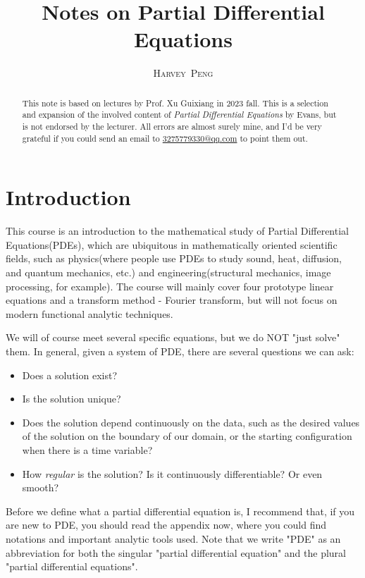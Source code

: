 \documentclass[hyperref,UTF8,12pt]{article}
\title{Notes on Partial Differential Equations}
\author{H\textsc{arvey}\ P\textsc{eng}}
\numberwithin{equation}{subsection}
\theoremstyle{plain}
\theoremstyle{definition}
\numberwithin{theorem}{section}
\numberwithin{lemma}{section}
\numberwithin{proposition}{section}
\numberwithin{remark}{section}
\numberwithin{corollary}{section}
\numberwithin{definition}{section}
\numberwithin{problem}{section}
\numberwithin{example}{section}
\begin{document}
\maketitle
\begin{abstract}
This note is based on lectures by Prof. Xu Guixiang in 2023 fall. This is a selection and expansion of the involved content of \textit{Partial Differential Equations} by Evans, but is not endorsed by the lecturer. All errors are almost surely mine, and I'd be very grateful if you could send an email to \href{mailto:3275779330@qq.com}{3275779330@qq.com} to point them out.
\end{abstract} 

\tableofcontents
\newpage 
\section{Introduction}

This course is an introduction to the mathematical study of Partial Differential
Equations(PDEs), which are ubiquitous in mathematically oriented scientific fields, such as physics(where people use PDEs to study sound, heat, diffusion, and quantum mechanics, etc.) and engineering(structural mechanics, image processing, for example). The course will mainly cover four prototype linear equations and a transform method - Fourier transform, but will not focus on modern functional analytic techniques.

We will of course meet several specific equations, but we do NOT "just solve" them. In general, given a system of PDE, there are several questions we can ask:
\begin{itemize}
	\item Does a solution exist?
	\item Is the solution unique?
	\item Does the solution depend continuously on the data, such as the desired values of the solution on the boundary of our domain, or the
	starting configuration when there is a time variable?
	\item How \textit{regular} is the solution? Is it continuously differentiable? Or even
	smooth?
\end{itemize}


Before we define what a partial differential equation is, I recommend that, if you are new to PDE, you should read the appendix now, where you could find notations and important analytic tools used. Note that we write "PDE" as an abbreviation for both the singular "partial differential equation" and the plural "partial differential equations".
\end{document}
